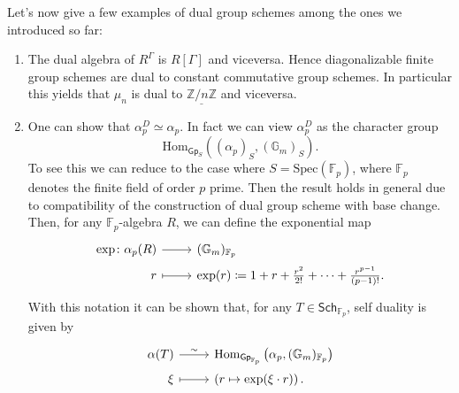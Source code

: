 \noindent
Let's now give a few examples of dual group schemes among the ones we introduced so far:
\begin{ex}[]\leavevmode\vspace{-.2\baselineskip}\label{ex:GroupSchemeDuality}
\begin{enumerate}
	\item The dual algebra of $R^\Gamma$ is $R[\Gamma]$ and viceversa.
		Hence diagonalizable finite group schemes are dual to constant commutative group schemes.
		In particular this yields that $\mu_n$ is dual to $\underline{\mathbb{Z}/n\mathbb{Z}}$
		and viceversa.

	\item One can show that $\alpha_p^D \simeq \alpha_p$.
		In fact we can view $\alpha_p^D$ as the character group
		\begin{equation*}
			\mathrm{Hom}_{\mathsf{Gp}_S} \left( (\alpha_p)_S, (\mathbb{G}_m)_S \right)
		.\end{equation*}
		To see this we can reduce to the case where 
		$S = \mathrm{Spec}(\mathbb{F}_p)$, where
		$\mathbb{F}_{p}$ denotes the finite field of order $p$ prime. Then
		the result holds in general due to compatibility of the construction of
		dual group scheme with base change.
		Then, for any $\mathbb{F}_{p}$-algebra $R$, we can define the exponential map
		\begin{equation*}
		\begin{tikzcd}[row sep = 0ex
			,/tikz/column 1/.append style={anchor=base east}
			,/tikz/column 2/.append style={anchor=base west}]
			\mathrm{exp}\colon \alpha_p(R) \arrow[r, "", rightarrow] &
			(\mathbb{G}_m)_{ \mathbb{F}_{p} } \\
			r \arrow[r, "", mapsto] & \mathrm{exp}(r) \coloneqq
			1 + r + \frac{r^2}{2!} + \cdots + \frac{r^{p-1}}{\left( p-1 \right)!}
		.\end{tikzcd}
		\end{equation*} 
		With this notation it can be shown that, for any
		$T \in \mathsf{Sch}_{ \mathbb{F}_{p} }$, self duality is given by
		\begin{equation*}
		\begin{tikzcd}[row sep = 0ex
			,/tikz/column 1/.append style={anchor=base east}
			,/tikz/column 2/.append style={anchor=base west}]
			\alpha(T) \arrow[r, "\sim", rightarrow] &
			\mathrm{Hom}_{\mathsf{Gp}_{ \mathbb{F}_{p} }}
			\left( \alpha_p, (\mathbb{G}_m)_{\mathbb{F}_{p}} \right) \\
			\xi \arrow[r, "", mapsto] & 
			\left( r \mapsto \mathrm{exp}(\xi \cdot r) \right)
		.\end{tikzcd}
		\end{equation*} 
\end{enumerate}
\end{ex}



